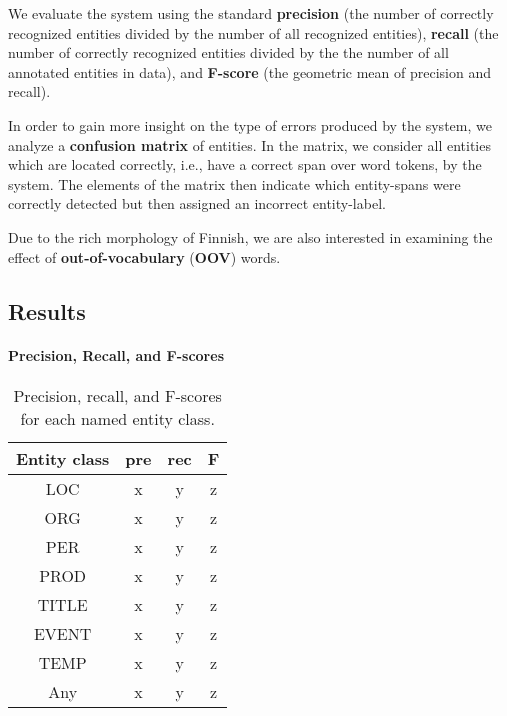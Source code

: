 \documentclass[11pt]{article}
\begin{document}
We evaluate the system using the standard \textbf{precision} (the number of correctly recognized entities divided by the number of all recognized entities), \textbf{recall} (the number of correctly recognized entities divided by the the number of all annotated entities in data), and \textbf{F-score} (the geometric mean of precision and recall).

In order to gain more insight on the type of errors produced by the system, we analyze a \textbf{confusion matrix} of entities. In the matrix, we consider all entities which are located correctly, i.e., have a correct span over word tokens, by the system. The elements of the matrix then indicate which entity-spans were correctly detected but then assigned an incorrect entity-label. 

Due to the rich morphology of Finnish, we are also interested in examining the effect of \textbf{out-of-vocabulary} (\textbf{OOV}) words. 



\subsection{Results}
\label{sec: results}


\paragraph{Precision, Recall, and F-scores}

\begin{table}[t!]
\begin{center}
\begin{tabular}{cccc} 
Entity class & pre & rec & F \\
\hline
\noalign{\smallskip}
LOC  & x & y & z  \\
ORG  & x & y & z  \\
PER  & x & y & z  \\
PROD  & x & y & z  \\
TITLE  & x & y & z  \\
EVENT  & x & y & z  \\
TEMP  & x & y & z  \\
\hline
\noalign{\smallskip}
Any & x & y & z  \\
\end{tabular}
\end{center}
\caption{Precision, recall, and F-scores for each named entity class.}
\label{tab: precision recall and f-scores}
\end{table}
\end{document}

